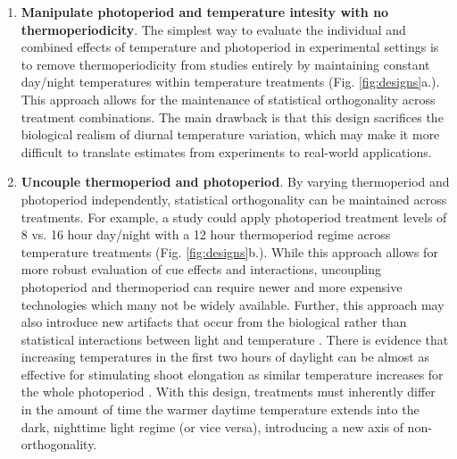 \documentclass[11pt]{article}
\begin{document}
\begin{enumerate}
\item \textbf{Manipulate photoperiod and temperature intesity with no thermoperiodicity}. The simplest  way to evaluate the individual and combined effects of temperature and photoperiod in experimental settings is to remove thermoperiodicity from studies entirely by maintaining constant day/night temperatures within temperature treatments (Fig. \ref{fig:designs}a.). This approach allows for the maintenance of statistical orthogonality across treatment combinations. The main drawback is that this design sacrifices the biological realism of diurnal temperature variation, which may make it more difficult to translate estimates from experiments to real-world applications.

\item \textbf{Uncouple thermoperiod and photoperiod}. By varying thermoperiod and photoperiod independently, statistical orthogonality can be maintained across treatments. For example, a study could apply photoperiod treatment levels of 8 vs. 16 hour day/night with a 12 hour thermoperiod regime across temperature treatments (Fig. \ref{fig:designs}b.). While this approach allows for more robust evaluation of cue effects and interactions, uncoupling photoperiod and thermoperiod can require newer and more expensive technologies which many not be widely available. Further, this approach may also introduce new artifacts that occur from the biological rather than statistical interactions between light and temperature \citep{Chew:2012wj}. There is evidence that increasing temperatures in the first two hours of daylight can be almost as effective for stimulating shoot elongation as similar temperature increases for the whole photoperiod \citep{Erwin1998}. With this design, treatments must inherently differ in the amount of time the warmer daytime temperature extends into the dark, nighttime light regime (or vice versa), introducing a new axis of non-orthogonality. %


\end{enumerate}
\end{document}
